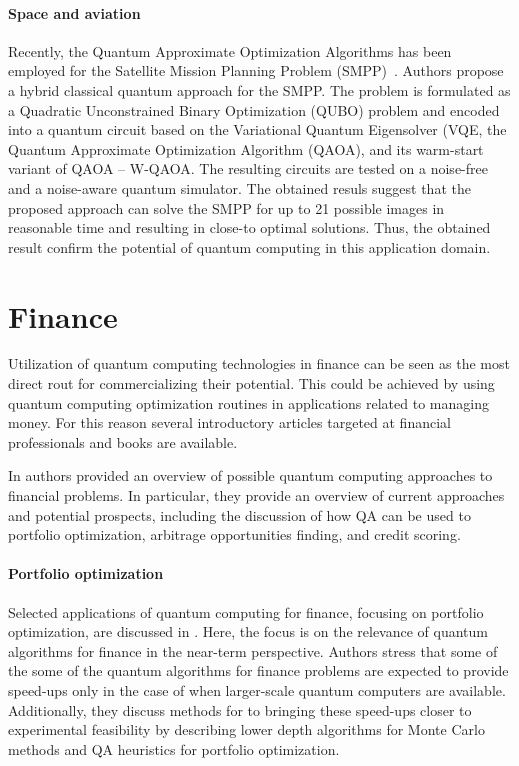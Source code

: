 \documentclass[a4paper,11pt]{article}
\begin{document}
\paragraph{Space and aviation}

Recently, the Quantum Approximate Optimization Algorithms has been employed for the Satellite Mission Planning Problem (SMPP)~\cite{quetschlich2023satellite}. Authors propose a hybrid classical quantum approach for the SMPP. The problem is formulated as a Quadratic Unconstrained Binary Optimization (QUBO) problem and encoded into a quantum circuit based on the Variational Quantum Eigensolver (VQE, the Quantum Approximate Optimization Algorithm (QAOA), and its warm-start variant of QAOA -- W-QAOA. The resulting circuits are tested on a noise-free and a noise-aware quantum simulator. The obtained resuls suggest that the proposed approach can solve the SMPP for up to 21 possible images in reasonable time and resulting in close-to optimal solutions. Thus, the obtained result confirm the potential of quantum computing in this application domain.
\section{Finance}


Utilization of quantum computing technologies in finance can be seen as the most direct rout for commercializing their potential. This could be achieved by using quantum computing optimization routines in applications related to managing money. For this reason several introductory articles targeted at financial professionals and books are available.

In \cite{orus2019quantum} authors provided an overview of possible quantum computing approaches to financial problems. In particular, they provide an overview of current approaches and potential prospects, including the discussion of how QA can be used to portfolio optimization, arbitrage opportunities finding, and credit scoring.

\paragraph{Portfolio optimization}
Selected applications of quantum computing for finance, focusing on portfolio optimization, are discussed in \cite{bouland2020prospects}. Here, the focus is on  the relevance of quantum algorithms for finance in the near-term perspective. Authors stress that some of the some of the quantum algorithms for finance problems are expected to provide speed-ups only in the case of when larger-scale quantum computers are available. Additionally, they discuss methods for to bringing these speed-ups closer to experimental feasibility by describing lower depth algorithms for Monte Carlo methods and QA heuristics for portfolio optimization.
\end{document}
